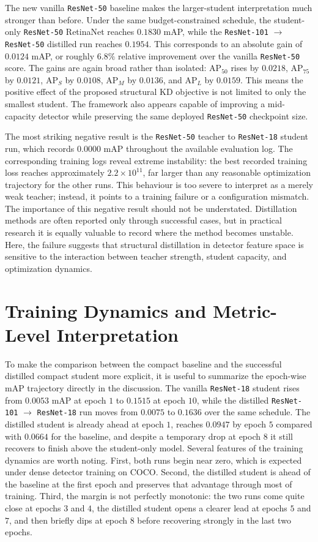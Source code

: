 The new vanilla \texttt{ResNet-50} baseline makes the larger-student interpretation much stronger than before. Under the same budget-constrained schedule, the student-only \texttt{ResNet-50} RetinaNet reaches $0.1830$ mAP, while the \texttt{ResNet-101} $\rightarrow$ \texttt{ResNet-50} distilled run reaches $0.1954$. This corresponds to an absolute gain of $0.0124$ mAP, or roughly $6.8\%$ relative improvement over the vanilla \texttt{ResNet-50} score. The gains are again broad rather than isolated: AP$_{50}$ rises by $0.0218$, AP$_{75}$ by $0.0121$, AP$_S$ by $0.0108$, AP$_M$ by $0.0136$, and AP$_L$ by $0.0159$. This means the positive effect of the proposed structural KD objective is not limited to only the smallest student. The framework also appears capable of improving a mid-capacity detector while preserving the same deployed \texttt{ResNet-50} checkpoint size.

The most striking negative result is the \texttt{ResNet-50} teacher to \texttt{ResNet-18} student run, which records $0.0000$ mAP throughout the available evaluation log. The corresponding training logs reveal extreme instability: the best recorded training loss reaches approximately $2.2 \times 10^{11}$, far larger than any reasonable optimization trajectory for the other runs. This behaviour is too severe to interpret as a merely weak teacher; instead, it points to a training failure or a configuration mismatch. The importance of this negative result should not be understated. Distillation methods are often reported only through successful cases, but in practical research it is equally valuable to record where the method becomes unstable. Here, the failure suggests that structural distillation in detector feature space is sensitive to the interaction between teacher strength, student capacity, and optimization dynamics.

\section{Training Dynamics and Metric-Level Interpretation}

To make the comparison between the compact baseline and the successful distilled compact student more explicit, it is useful to summarize the epoch-wise mAP trajectory directly in the discussion. The vanilla \texttt{ResNet-18} student rises from $0.0053$ mAP at epoch $1$ to $0.1515$ at epoch $10$, while the distilled \texttt{ResNet-101} $\rightarrow$ \texttt{ResNet-18} run moves from $0.0075$ to $0.1636$ over the same schedule. The distilled student is already ahead at epoch $1$, reaches $0.0947$ by epoch $5$ compared with $0.0664$ for the baseline, and despite a temporary drop at epoch $8$ it still recovers to finish above the student-only model. Several features of the training dynamics are worth noting. First, both runs begin near zero, which is expected under dense detector training on COCO. Second, the distilled student is ahead of the baseline at the first epoch and preserves that advantage through most of training. Third, the margin is not perfectly monotonic: the two runs come quite close at epochs $3$ and $4$, the distilled student opens a clearer lead at epochs $5$ and $7$, and then briefly dips at epoch $8$ before recovering strongly in the last two epochs.

